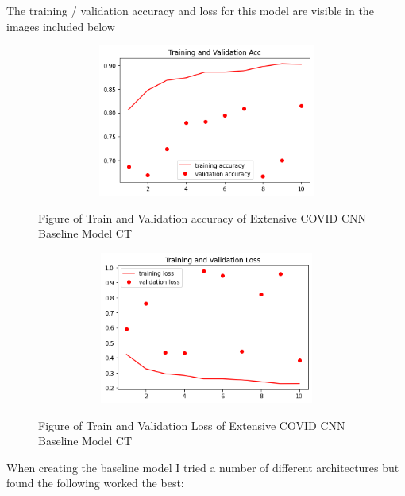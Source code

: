 The training / validation accuracy and loss for this model are visible in the images included below
 \begin{figure}[H]
    \centering
    \includegraphics[width=1\textwidth,height=5cm,keepaspectratio]{Images/ExtensiveCNNBaselineModelExtensiveCovidAccCT.png}\\
    \caption{Figure of Train and Validation accuracy of Extensive COVID CNN Baseline Model CT}
    \label{fig:Extensive COVID CT CNN Baseline Model CNN Baseline Train and Validation Accuracy}
\end{figure}
 \begin{figure}[H]
    \centering
\includegraphics[width=1\textwidth,height=5cm,keepaspectratio]{Images/ExtensiveCNNBaselineModelExtensiveCovidLossCT.png}\\
    \caption{Figure of Train and Validation Loss of Extensive COVID CNN Baseline Model CT}
    \label{fig:Extensive COVID CT CNN Baseline Model CNN Baseline Train and Validation Loss}
\end{figure}
When creating the baseline model I tried a number of different architectures but found the following worked the best:
